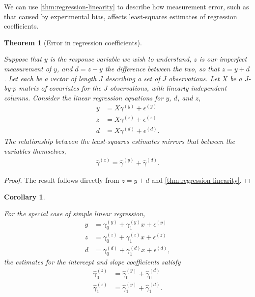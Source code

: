 \documentclass[
]{article}
\newtheorem{theorem}{Theorem}[section]
\newtheorem{corollary}{Corollary}[section]
\theoremstyle{definition}
\theoremstyle{definition}
\theoremstyle{definition}
\theoremstyle{definition}
\theoremstyle{remark}
\begin{document}
We can use \ref{thm:regression-linearity} to describe how measurement error, such as that caused by experimental bias, affects least-squares estimates of regression coefficients.

\begin{theorem}[Error in regression coefficients]
\protect\hypertarget{thm:regression-error}{}\label{thm:regression-error}

Suppose that \(y\) is the response variable we wish to understand, \(z\) is our imperfect measurement of \(y\), and \(d = z - y\) the difference between the two, so that \(z = y + d\).
Let each be a vector of length \(J\) describing a set of \(J\) observations.
Let \(X\) be a \(J\)-by-\(p\) matrix of covariates for the \(J\) observations, with linearly independent columns.
Consider the linear regression equations for \(y\), \(d\), and \(z\),
\begin{align}
  y &= X \gamma^{(y)} + \epsilon^{(y)} \\
  z &= X \gamma^{(z)} + \epsilon^{(z)} \\
  d &= X \gamma^{(d)} + \epsilon^{(d)}.
\end{align}
The relationship between the least-squares estimates mirrors that between the variables themselves,
\begin{align}
  \label{eq:regression-coefficient-error}
  \hat \gamma^{(z)} = \hat \gamma^{(y)} + \hat \gamma^{(d)}.
\end{align}

\end{theorem}

\begin{proof}

The result follows directly from \(z = y + d\) and \ref{thm:regression-linearity}.

\end{proof}

\begin{corollary}
\protect\hypertarget{cor:regression-error-simple}{}\label{cor:regression-error-simple}

For the special case of simple linear regression,
\begin{align}
  y &= \gamma_0^{(y)} + \gamma_1^{(y)} x + \epsilon^{(y)} \\
  z &= \gamma_0^{(z)} + \gamma_1^{(z)} x + \epsilon^{(z)} \\
  d &= \gamma_0^{(d)} + \gamma_1^{(d)} x + \epsilon^{(d)},
\end{align}
the estimates for the intercept and slope coefficients satisfy
\begin{align}
  \hat \gamma_0^{(z)} &= \hat \gamma_0^{(y)} + \hat \gamma_0^{(d)} \\
  \hat \gamma_1^{(z)} &= \hat \gamma_1^{(y)} + \hat \gamma_1^{(d)}.
\end{align}

\end{corollary}
\end{document}
